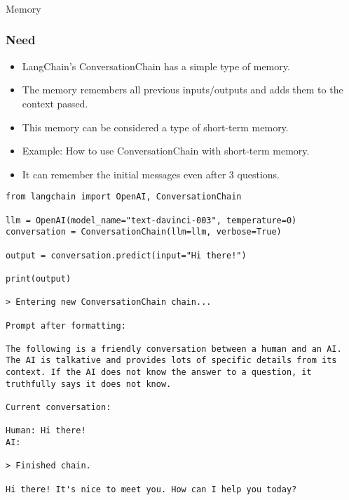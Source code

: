 \begin{frame}[fragile]\frametitle{}
\begin{center}
{\Large Memory}
\end{center}
\end{frame}

\begin{frame}[fragile]
\frametitle{Need}

\begin{itemize}
    \item LangChain's ConversationChain has a simple type of memory.
    \item The memory remembers all previous inputs/outputs and adds them to the context passed.
    \item This memory can be considered a type of short-term memory.
    \item Example: How to use ConversationChain with short-term memory.
    \item It can remember the initial messages even after 3 questions.
\end{itemize}

\begin{lstlisting}
from langchain import OpenAI, ConversationChain

llm = OpenAI(model_name="text-davinci-003", temperature=0)
conversation = ConversationChain(llm=llm, verbose=True)

output = conversation.predict(input="Hi there!")

print(output)

> Entering new ConversationChain chain...

Prompt after formatting:

The following is a friendly conversation between a human and an AI. The AI is talkative and provides lots of specific details from its context. If the AI does not know the answer to a question, it truthfully says it does not know.

Current conversation:

Human: Hi there!
AI:

> Finished chain.

Hi there! It's nice to meet you. How can I help you today?
\end{lstlisting}

\end{frame}

